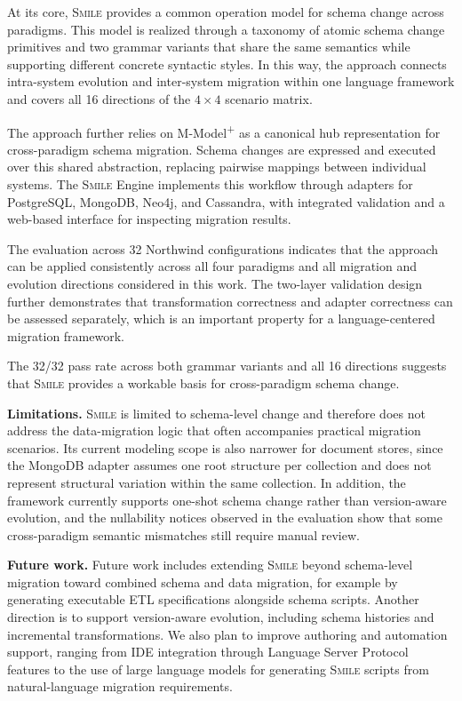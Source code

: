 \documentclass{llncs}
\begin{document}
At its core, \textsc{Smile} provides a common operation model for schema change across paradigms.
This model is realized through a taxonomy of atomic schema change primitives and two grammar variants that share the same semantics while supporting different concrete syntactic styles.
In this way, the approach connects intra-system evolution and inter-system migration within one language framework and covers all 16 directions of the $4 \times 4$ scenario matrix.

The approach further relies on M-Model\textsuperscript{+} as a canonical hub representation for cross-paradigm schema migration.
Schema changes are expressed and executed over this shared abstraction, replacing pairwise mappings between individual systems.
The \textsc{Smile} Engine implements this workflow through adapters for
PostgreSQL, MongoDB, Neo4j, and Cassandra, with integrated validation
and a web-based interface for inspecting migration results.

The evaluation across 32 Northwind configurations indicates that the approach can be applied consistently across all four paradigms and all migration and evolution directions considered in this work.
The two-layer validation design further demonstrates that transformation correctness and adapter correctness can be assessed separately, which is an important property for a language-centered migration framework.

The 32/32 pass rate across both grammar variants and all 16 directions suggests that \textsc{Smile} provides a workable basis for cross-paradigm schema change.

\textbf{Limitations.}
\textsc{Smile} is limited to schema-level change and therefore does not address the data-migration logic that often accompanies practical migration scenarios.
Its current modeling scope is also narrower for document stores, since the MongoDB adapter assumes one root structure per collection and does not represent structural variation within the same collection.
In addition, the framework currently supports one-shot schema change rather than version-aware evolution, and the nullability notices observed in the evaluation show that some cross-paradigm semantic mismatches still require manual review.

\textbf{Future work.}
Future work includes extending \textsc{Smile} beyond schema-level migration toward combined schema and data migration, for example by generating executable ETL specifications alongside schema scripts.
Another direction is to support version-aware evolution, including schema histories and incremental transformations.
We also plan to improve authoring and automation support, ranging from IDE integration through Language Server Protocol features to the use of large language models for generating \textsc{Smile} scripts from natural-language migration requirements.
\end{document}
